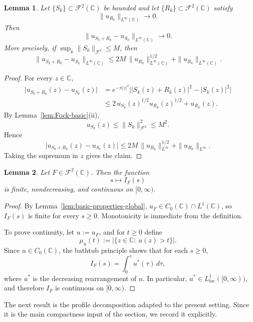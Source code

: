 \documentclass[a4paper,11pt,reqno]{amsart}
\numberwithin{equation}{section}
\theoremstyle{plain} %
\newtheorem{lemma}{Lemma}[section]
\theoremstyle{definition} %
\theoremstyle{remark}
\newcommand{\C}{\mathbb{C}}
\begin{document}
\begin{lemma}\label{lem:density-perturbation-global}
Let \(\{S_k\}\subset \mathcal F^2(\C)\) be bounded and let \(\{R_k\}\subset \mathcal
F^2(\C)\) satisfy
\[
\|u_{R_k}\|_{L^\infty(\C)}\to 0.
\]
Then
\[
\|u_{S_k+R_k}-u_{S_k}\|_{L^\infty(\C)}\to 0.
\]
More precisely, if \(\sup_k \|S_k\|_{\mathcal F^2}\le M\), then
\[
\|u_{S_k+R_k}-u_{S_k}\|_{L^\infty(\C)}
\le
2M\,\|u_{R_k}\|_{L^\infty(\C)}^{1/2}
+\|u_{R_k}\|_{L^\infty(\C)}.
\]
\end{lemma}

\begin{proof}
For every \(z\in \C\),
\begin{align*}
\big|u_{S_k+R_k}(z)-u_{S_k}(z)\big|
&=
e^{-\pi |z|^2}\big||S_k(z)+R_k(z)|^2-|S_k(z)|^2\big| \\
&\le
2\,u_{S_k}(z)^{1/2}u_{R_k}(z)^{1/2}
+u_{R_k}(z).
\end{align*}
By Lemma~\ref{lem:Fock-basic}(ii),
\[
u_{S_k}(z)\le \|S_k\|_{\mathcal F^2}^2\le M^2.
\]
Hence
\[
\big|u_{S_k+R_k}(z)-u_{S_k}(z)\big|
\le
2M\,\|u_{R_k}\|_{L^\infty}^{1/2}
+\|u_{R_k}\|_{L^\infty}.
\]
Taking the supremum in \(z\) gives the claim.
\end{proof}

\begin{lemma}\label{lem:I-continuity-global}
Let \(F\in \mathcal F^2(\C)\). Then the function
\[
s\mapsto I_F(s)
\]
is finite, nondecreasing, and continuous on \([0,\infty)\).
\end{lemma}

\begin{proof}
By Lemma~\ref{lem:basic-properties-global}, \(u_F\in C_0(\C)\cap L^1(\C)\), so
\(I_F(s)\) is finite for every \(s\ge 0\). Monotonicity is immediate from the
definition.

To prove continuity, let \(u:=u_F\), and for \(t\ge 0\) define
\[
\mu_u(t):=\big|\{z\in \C:\ u(z)>t\}\big|.
\]
Since \(u\in C_0(\C)\), the bathtub principle shows that for each \(s\ge 0\),
\[
I_F(s)=\int_0^s u^*(\tau)\,d\tau,
\]
where \(u^*\) is the decreasing rearrangement of \(u\). In particular,
\(u^*\in L^1_{\mathrm{loc}}([0,\infty))\), and therefore \(I_F\) is continuous on
\([0,\infty)\).
\end{proof}

The next result is the profile decomposition adapted to the present setting.
Since it is the main compactness input of the section, we record it explicitly.
\end{document}
